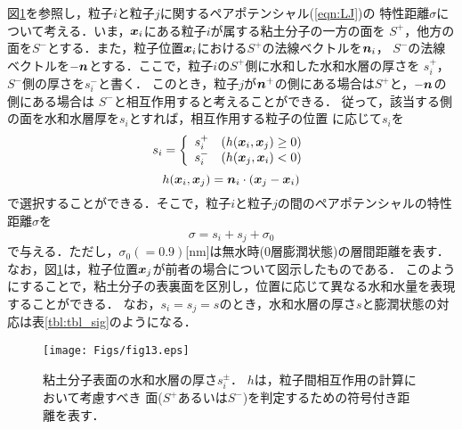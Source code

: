 図\ref{fig:fig13}を参照し，粒子$i$と粒子$j$に関するペアポテンシャル(\ref{eqn:LJ})の
特性距離$\sigma$について考える．いま，$\mbox{\boldmath $x$}_i$にある粒子$i$が属する粘土分子の一方の面を
$S^+$，他方の面を$S^-$とする．また，粒子位置$\mbox{\boldmath $x$}_i$における$S^+$の法線ベクトルを$\mbox{\boldmath $n$}_i$，
$S^-$の法線ベクトルを$-\mbox{\boldmath $n$}$とする．ここで，粒子$i$の$S^+$側に水和した水和水層の厚さを
$s_i^+$，$S^-$側の厚さを$s_i^-$と書く．
このとき，粒子$j$が$\mbox{\boldmath $n$}^+$の側にある場合は$S^+$と，$-\mbox{\boldmath $n$}$の側にある場合は
$S^-$と相互作用すると考えることができる．
従って，該当する側の面を水和水層厚を$s_i$とすれば，相互作用する粒子の位置
に応じて$s_i$を
\begin{equation}
	s_i=\left\{
	\begin{array}{cc}
		s_i^+ & (h(\mbox{\boldmath $x$}_i,\mbox{\boldmath $x$}_j) \ge 0)\\
		s_i^- & (h(\mbox{\boldmath $x$}_j,\mbox{\boldmath $x$}_i) <0)
	\end{array}
	\right.
	\label{eqn:si_switch}
\end{equation}
\begin{equation}
	h(\mbox{\boldmath $x$}_i,\mbox{\boldmath $x$}_j) =\mbox{\boldmath $n$}_i\cdot \left(\mbox{\boldmath $x$}_j-\mbox{\boldmath $x$}_i\right)
	\label{eqn:h_sgn}
\end{equation}
で選択することができる．そこで，粒子$i$と粒子$j$の間のペアポテンシャルの特性距離$\sigma$を
\begin{equation}
	\sigma=s_i+s_j+\sigma_0
	\label{eqn:sig_ij}
\end{equation}
で与える．ただし，$\sigma_0(=0.9)$[nm]は無水時(0層膨潤状態)の層間距離を表す．
なお，図\ref{fig:fig13}は，粒子位置$\mbox{\boldmath $x$}_j$が前者の場合について図示したものである．
このようにすることで，粘土分子の表裏面を区別し，位置に応じて異なる水和水量を表現することができる．
なお，$s_i=s_j=s$のとき，水和水層の厚さ$s$と膨潤状態の対応は表\ref{tbl:tbl_sig}のようになる．
\begin{figure}[h]
	\begin{center}
	\texttt{[image: Figs/fig13.eps]} 
	\end{center}
	\caption{
		粘土分子表面の水和水層の厚さ$s_i^\pm $．
		$h$は，粒子間相互作用の計算において考慮すべき
		面($S^+$あるいは$S^-$)を判定するための符号付き距離を表す．
	} 
	\label{fig:fig13}
\end{figure}
